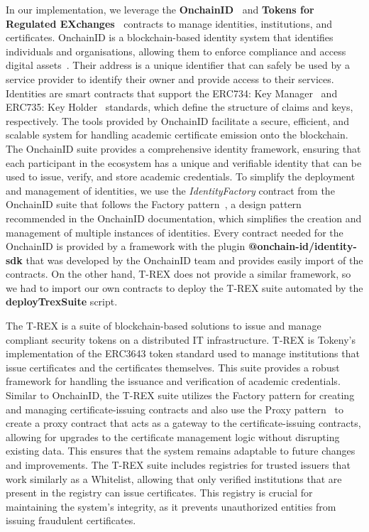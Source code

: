 In our implementation, we leverage the \textbf{OnchainID~\cite{ONCHAINID}} and \textbf{Tokens for Regulated EXchanges~\cite{trexPurposeAndArchitecture}} contracts to manage identities, institutions, and certificates.
OnchainID is a blockchain-based identity system that identifies individuals and organisations, allowing them to enforce compliance and access digital assets~\cite{onchainidPruposalAndArchitecture}.
Their address is a unique identifier that can safely be used by a service provider to identify their owner and provide access to their services. Identities are smart contracts that support the ERC734: Key Manager~\cite{Vogelsteller_2017_key_manager} and ERC735: Key Holder~\cite{Vogelsteller_2017} standards, which define the structure of claims and keys, respectively.
The tools provided by OnchainID facilitate a secure, efficient, and scalable system for handling academic certificate emission onto the blockchain.
The OnchainID suite provides a comprehensive identity framework, ensuring that each participant in the ecosystem has a unique and verifiable identity
that can be used to issue, verify, and store academic credentials.
To simplify the deployment and management of identities, we use the \textit{IdentityFactory} contract from the OnchainID suite that follows the Factory pattern~\cite{harmes2008factory}, a design pattern recommended in the OnchainID documentation, which simplifies the creation and management of multiple instances of identities.
Every contract needed for the OnchainID is provided by a framework with the plugin \textbf{@onchain-id/identity-sdk} that was developed by the OnchainID team and provides easily import of the contracts.
On the other hand, T-REX does not provide a similar framework, so we had to import our own contracts to deploy the T-REX suite automated by the \textbf{deployTrexSuite} script.

The T-REX is a suite of blockchain-based solutions to issue and manage compliant security tokens on a distributed IT infrastructure. T-REX is Tokeny's implementation of the ERC3643 token standard used to manage institutions that issue certificates and the certificates themselves.
This suite provides a robust framework for handling the issuance and verification of academic credentials.
Similar to OnchainID, the T-REX suite utilizes the Factory pattern for creating and managing certificate-issuing contracts and also
use the Proxy pattern~\cite{harmes2008proxy} to create a proxy contract that acts as a gateway to the certificate-issuing contracts, allowing for upgrades to the certificate management logic without disrupting existing data.
This ensures that the system remains adaptable to future changes and improvements.
The T-REX suite includes registries for trusted issuers that work similarly as a Whitelist, allowing that only verified institutions that are present in the registry can issue certificates. This registry is crucial for maintaining the system's integrity, as it prevents unauthorized entities from issuing fraudulent certificates.

